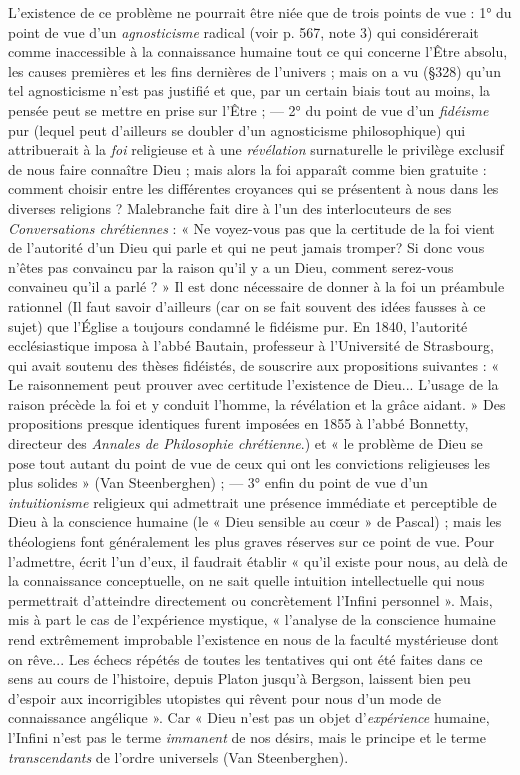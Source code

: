 \vspace{0.24cm}
{\footnotesize L'existence de ce problème ne pourrait être niée que de trois points
de vue : 1° du point de vue d’un \textsf{\textit {agnosticisme}} radical (voir p. 567, note 3)
qui considérerait comme inaccessible à la connaissance humaine tout ce qui
concerne l'Être absolu, les causes premières et les fins dernières de l’univers ;
mais on a vu (\S328) qu'un tel agnosticisme n’est pas justifié et que,
par un certain biais tout au moins, la pensée peut se mettre en prise sur
l'Être ; — 2° du point de vue d’un \textsf{\textit {fidéisme}} pur (lequel peut d’ailleurs se
doubler d’un agnosticisme philosophique) qui attribuerait à la {\it foi} religieuse
et à une {\it révélation} surnaturelle le privilège exclusif de nous faire connaître
Dieu ; mais alors la foi apparaît comme bien gratuite : comment choisir
entre les différentes croyances qui se présentent à nous dans les diverses
religions ? Malebranche fait dire à l’un des interlocuteurs de ses {\it Conversations
chrétiennes} : « Ne voyez-vous pas que la certitude de la foi vient
de l'autorité d’un Dieu qui parle et qui ne peut jamais tromper? Si donc
vous n'êtes pas convaincu par la raison qu'il y a un Dieu, comment serez-vous
convaineu qu'il a parlé ? » Il est donc nécessaire de donner à la foi
un préambule rationnel
{\scriptsize (Il faut savoir d'ailleurs (car on se fait souvent des idées fausses à ce sujet) que
l'Église a toujours condamné le fidéisme pur. En 1840, l'autorité ecclésiastique imposa
à l'abbé Bautain, professeur à l'Université de Strasbourg, qui avait soutenu des thèses
fidéistés, de souscrire aux propositions suivantes : « Le raisonnement peut prouver avec
certitude l'existence de Dieu... L'usage de la raison précède la foi et y conduit l'homme,
la révélation et la grâce aidant. » Des propositions presque identiques furent imposées en
1855 à l'abbé Bonnetty, directeur des {\it Annales de Philosophie chrétienne}.)}
et « le problème de Dieu se pose tout autant du
point de vue de ceux qui ont les convictions religieuses les plus solides »
(Van Steenberghen) ; — 3° enfin du point de vue d'un \textsf{\textit {intuitionisme}} religieux
qui admettrait une présence immédiate et perceptible de Dieu à la
conscience humaine (le « Dieu sensible au cœur » de Pascal) ; mais les théologiens
font généralement les plus graves réserves sur ce point de vue. Pour
l’admettre, écrit l’un d’eux, il faudrait établir « qu'il existe pour nous,
au delà de la connaissance conceptuelle, on ne sait quelle intuition intellectuelle
qui nous permettrait d'atteindre directement ou concrètement l’Infini
personnel ». Mais, mis à part le cas de l’expérience mystique, « l'analyse de
la conscience humaine rend extrêmement improbable l'existence en nous
de la faculté mystérieuse dont on rêve... Les échecs répétés de toutes
les tentatives qui ont été faites dans ce sens au cours de l’histoire, depuis
Platon jusqu’à Bergson, laissent bien peu d’espoir aux incorrigibles utopistes
qui rêvent pour nous d’un mode de connaissance angélique ». Car
« Dieu n’est pas un objet d'{\it expérience} humaine, l’Infini n’est pas le terme
{\it immanent} de nos désirs, mais le principe et le terme {\it transcendants} de l’ordre
universels (Van Steenberghen).}
\vspace{0.31cm}

